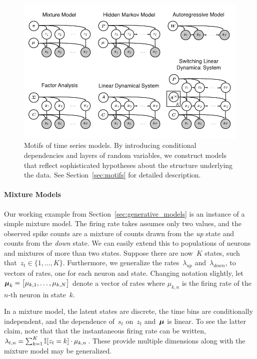 \begin{figure}[t]
  \centering%
\includegraphics[width=5.5in]{figures/ch1/figure2b-copy} 
\vspace{-.25in}
\caption[Motifs of time series models]{Motifs of time series models.
  By introducing conditional dependencies and layers of random
  variables, we construct models that reflect sophisticated hypotheses
  about the structure underlying the data.  See
  Section~\ref{sec:motifs} for detailed description.}
\label{fig:motifs}
\end{figure}


\paragraph{Mixture Models}
Our working example from Section~\ref{sec:generative_models} is an
instance of a simple mixture model.  The firing rate takes assumes
only two values, and the observed spike counts are a mixture of counts
drawn from the \textit{up} state and counts from the \textit{down}
state. We can easily extend this to populations of neurons and
mixtures of more than two states.  Suppose there are now~$K$ states,
such that~${z_t \in \{1, \ldots, K\}}$. Furthermore, we generalize the
rates~$\lambda_{\textit{up}}$ and~$\lambda_{\textit{down}}$, to
vectors of rates, one for each neuron and state.  Changing notation
slightly, let~${\boldsymbol{\mu}_k =
  \big[ \mu_{k,1}, \ldots, \mu_{k,N}\big]}$ denote a vector
of rates where $\mu_{k,n}$ is the firing rate of
the~${n\text{-th}}$ neuron in state~$k$.

In a mixture model, the latent states are discrete, the time bins are
conditionally independent, and the dependence of~$s_t$ on~$z_t$
and~$\boldsymbol{\mu}$ is linear.  To see the latter claim, note that that the
instantaneous firing rate can be written, ${\lambda_{t,n} =
  \sum_{k=1}^K \mathbb{I}[z_t=k] \cdot \mu_{k,n}}$. These provide multiple
dimensions along with the mixture model may be generalized.

